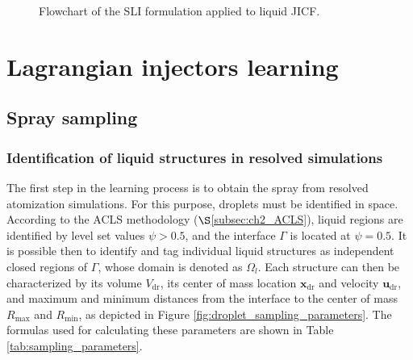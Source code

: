 \begin{figure}[h!]	
	\centering
	\caption{Flowchart of the SLI formulation applied to liquid JICF.}
	\label{fig:SLI_graphic_description}
\end{figure}


%










\section{Lagrangian injectors learning}
	\label{sec:ch4_SLI_learning}


\subsection{Spray sampling}
\label{subsec:SLI_spray_sampling}

\subsubsection*{Identification of liquid structures in resolved simulations}

The first step in the learning process is to obtain the spray from resolved atomization simulations. For this purpose, droplets must be identified in space. According to the ACLS methodology ($\S$\ref{subsec:ch2_ACLS}), liquid regions are identified by level set values $\psi > 0.5$, and the interface $\Gamma$ is located at $\psi = 0.5$. It is possible then to identify and tag individual liquid structures as independent closed regions of $\Gamma$, whose domain is denoted as $\Omega_l$. Each structure can then be characterized by its volume $V_\mathrm{dr}$, its center of mass location $\textbf{x}_\mathrm{dr}$ and velocity $\textbf{u}_\mathrm{dr}$, and maximum and minimum distances from the interface to the center of mass $R_\mathrm{max}$ and $R_\mathrm{min}$, as depicted in Figure \ref{fig:droplet_sampling_parameters}. The formulas used for calculating these parameters are shown in Table \ref{tab:sampling_parameters}. 

